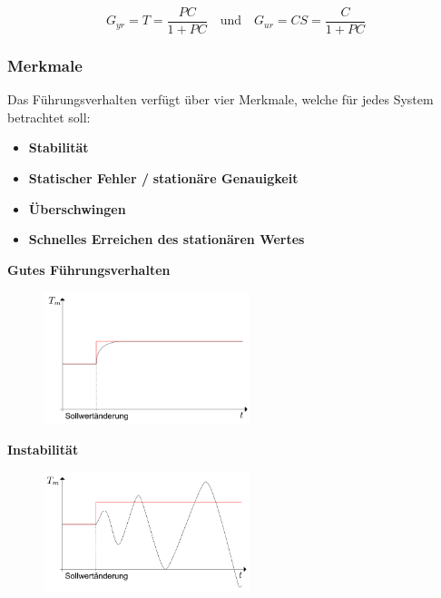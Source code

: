 \documentclass[
  10pt,
  a4paper,
  twocolumn]{article}
\providecommand{\tightlist}{%
  \setlength{\itemsep}{0pt}\setlength{\parskip}{0pt}}\usepackage{longtable,booktabs,array}
\numberwithin{equation}{section}
\begin{document}
\[
G_{yr}=T=\frac{PC}{1+PC}\quad\text{und}\quad G_{ur}=CS=\frac{C}{1+PC}
\]

\hypertarget{merkmale}{%
\subsubsection{Merkmale}\label{merkmale}}

Das Führungsverhalten verfügt über vier Merkmale, welche für jedes
System betrachtet soll:

\begin{itemize}
\tightlist
\item
  \textbf{Stabilität}
\item
  \textbf{Statischer Fehler /} \textbf{stationäre Genauigkeit}
\item
  \textbf{Überschwingen}
\item
  \textbf{Schnelles Erreichen des stationären Wertes}
\end{itemize}

\textbf{Gutes Führungsverhalten}

\begin{figure}[H]

{\centering \includegraphics[width=6cm,height=\textheight]{images/fuhrungsverhalten/gutes_verhalten.png}

}

\end{figure}

\textbf{Instabilität}

\begin{figure}[H]

{\centering \includegraphics[width=6cm,height=\textheight]{images/fuhrungsverhalten/instabil.png}

}

\end{figure}
\end{document}
